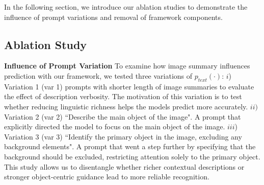 \documentclass[10pt]{article} %
\begin{document}
In the following section, we introduce our ablation studies to demonstrate the influence of prompt variations and removal of framework components.

\subsection{Ablation Study}
\textbf{Influence of Prompt Variation} To examine how image summary influences prediction with our framework, we tested three variations of $p_{text}(\cdot)$:
$i$) Variation 1 (var 1) prompts with shorter length of image summaries to evaluate the effect of description verbosity.
The motivation of this variation is to test whether reducing linguistic richness helps the models predict more accurately.
$ii)$ Variation 2 (var 2) ``Describe the main object of the image".
A prompt that explicitly directed the model to focus on the main object of the image.
$iii$) Variation 3 (var 3) ``Identify the primary object in the image, excluding any background elements".
A prompt that went a step further by specifying that the background should be excluded, restricting attention solely to the primary object.
This study allows us to disentangle whether richer contextual descriptions or stronger object-centric guidance lead to more reliable recognition. 
% 
\begin{table}[t]
\caption{Ablation Study on prompt variations with Qwen 2.5-7B-VL. We show $H_{u-m}$ scores (\%) for the individual target private classes in the VisDA validation dataset.
Numbers in each cell represent the results on the validation set.}
\label{tab: prompt variation}
\centering
{}
\vspace{-6mm}
\end{table}
\end{document}
